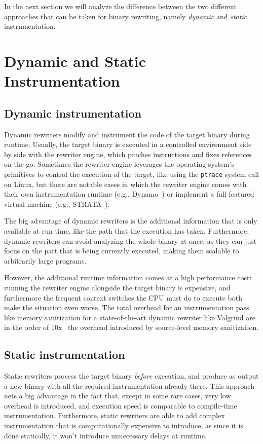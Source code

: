 \documentclass[a4paper,11pt,oneside]{report}
\begin{document}
In the next section we will analyze the difference between the two different 
approaches that can be taken for binary rewriting, namely \emph{dynamic} and 
\emph{static} instrumentation.




\section{Dynamic and Static Instrumentation}

\subsection{Dynamic instrumentation} Dynamic rewriters modify and instrument
the code of the target binary during runtime. Usually, the target binary is
executed in a controlled environment side by side with the rewriter engine,
which patches instructions and fixes references on the go. Sometimes the
rewriter engine leverages the operating system's primitives to control the
execution of the target, like using the \texttt{ptrace} system call on Linux,
but there are notable cases in which the rewriter engine comes with their own
instrumentation runtime (e.g., Dynamo~\cite{dynamo}) or implement a full
featured virtual machine (e.g., STRATA~\cite{strata}).

The big advantage of dynamic rewriters is the additional information that is 
only available at run time, like the path that the execution has taken.  
Furthermore, dynamic rewriters can avoid analyzing the whole binary at once, as 
they can just focus on the part that is being currently executed, making them 
scalable to arbitrarily large programs.

However, the additional runtime information comes at a high performance cost: 
running the rewriter engine alongside the target binary is expensive, and 
furthermore the frequent context switches the CPU must do to execute both make 
the situation even worse. The total overhead for an instrumentation pass like 
memory sanitization for a state-of-the-art dynamic rewriter like Valgrind are 
in the order of 10x~\cite{dinesh20oakland} the overhead introduced by 
source-level memory sanitization.

\subsection{Static instrumentation}
Static rewriters process the target binary \emph{before} execution, and produce 
as output a new binary with all the required instrumentation already there.  
This approach nets a big advantage in the fact that, except in some rare cases, 
very low overhead is introduced, and execution speed is comparable to 
compile-time instrumentation. Furthermore, static rewriters are able to add 
complex instrumentation that is computationally expensive to introduce, as 
since it is done statically, it won't introduce unnecessary delays at runtime.
\end{document}
